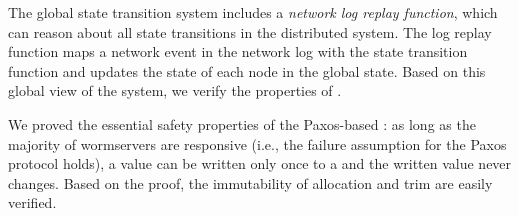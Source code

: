 The global state transition system includes a \textit{network log replay function}, which can reason about all state transitions in the distributed system. The log replay function maps a network event in the network log with the state transition function and updates the state of each node in the global state. Based on this global view of the system, we verify the properties of \sysname{}.


We proved the essential safety properties of the Paxos-based \sysname{}: as long as the majority of wormservers are responsive (i.e., the failure assumption for the Paxos protocol holds), a value can be written only once to a \WOR{} and the written value never changes. Based on the \WOR{} proof, the immutability of \WOS{} allocation and trim are easily verified.



